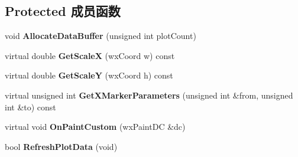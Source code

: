 \subsection*{Protected 成员函数}
\begin{DoxyCompactItemize}
\item 
\hypertarget{class_plot_canvas_info_base_a11581b5a2a80dae77f47656d31c12875}{void {\bfseries Allocate\+Data\+Buffer} (unsigned int plot\+Count)}\label{class_plot_canvas_info_base_a11581b5a2a80dae77f47656d31c12875}

\item 
\hypertarget{class_plot_canvas_info_base_abf159bd31982faf010ba6602c144b70f}{virtual double {\bfseries Get\+Scale\+X} (wx\+Coord w) const }\label{class_plot_canvas_info_base_abf159bd31982faf010ba6602c144b70f}

\item 
\hypertarget{class_plot_canvas_info_base_adc295e8baa81875992a9e61f46b0f2ca}{virtual double {\bfseries Get\+Scale\+Y} (wx\+Coord h) const }\label{class_plot_canvas_info_base_adc295e8baa81875992a9e61f46b0f2ca}

\item 
\hypertarget{class_plot_canvas_info_base_aaead5abf602e7d6510e71e077a7ab518}{virtual unsigned int {\bfseries Get\+X\+Marker\+Parameters} (unsigned int \&from, unsigned int \&to) const }\label{class_plot_canvas_info_base_aaead5abf602e7d6510e71e077a7ab518}

\item 
\hypertarget{class_plot_canvas_info_base_a394762b33b177ba3228c03908c324fd0}{virtual void {\bfseries On\+Paint\+Custom} (wx\+Paint\+D\+C \&dc)}\label{class_plot_canvas_info_base_a394762b33b177ba3228c03908c324fd0}

\item 
\hypertarget{class_plot_canvas_info_base_aa2bd04908223fcea7309b5fd4a40ca23}{bool {\bfseries Refresh\+Plot\+Data} (void)}\label{class_plot_canvas_info_base_aa2bd04908223fcea7309b5fd4a40ca23}

\end{DoxyCompactItemize}
